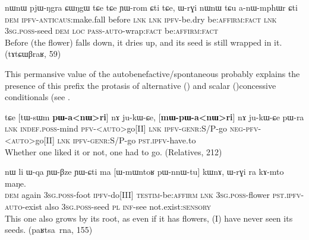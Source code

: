 \documentclass[oldfontcommands,oneside,a4paper,11pt]{article}
\newcommand{\ipa}[1]{{\phon \mbox{#1}}} %
\begin{document}
\begin{exe}
\ex \label{ex:anWmphWr}
\gll
\ipa{nɯnɯ} 	\ipa{pjɯ-ŋgra} 	\ipa{ɕɯŋgɯ} 	\ipa{tɕe} 	\ipa{tɕe} 	\ipa{ɲɯ-rom} 	\ipa{ɕti} 	\ipa{tɕe,} 	\ipa{ɯ-rɣi} 	\ipa{nɯnɯ} 	\ipa{tɕu} 	\ipa{a-nɯ-mphɯr} 	\ipa{ɕti} \\
\textsc{dem} \textsc{ipfv-anticaus}:make.fall before \textsc{lnk}  \textsc{lnk} \textsc{ipfv}-be.dry be\textsc{:affirm:fact} \textsc{lnk} \textsc{3sg.poss}-seed \textsc{dem} \textsc{loc} \textsc{pass-auto}-wrap:\textsc{fact} be\textsc{:affirm:fact} \\
\glt Before (the flower) falls down, it dries up, and its seed is still wrapped in it. (\ipa{tɤtɕɯβraʁ}, 59)
\end{exe} 



This permansive value of the autobenefactive/spontaneous probably explains the presence of this prefix the protasis of alternative  (\citealt{ex:pannWri}) and scalar (\citealt{ex:pWnnWtu.kWnA})concessive conditionals (see \citet{jacques14linking}.

\begin{exe}
\ex  \label{ex:pannWri}
\gll
\ipa{tɕe}  	[\ipa{tɯ-sɯm}  	\textbf{\ipa{pɯ-a<nɯ>ri}}]  	\ipa{nɤ}  	\ipa{ju-kɯ-ɕe,}  	[\textbf{\ipa{mɯ-pɯ-a<nɯ>ri}}]  	\ipa{nɤ}  	\ipa{ju-kɯ-ɕe}  	\ipa{pɯ-ra}  \\
\textsc{lnk} \textsc{indef.poss}-mind  \textsc{pfv-<auto>}go[II] \textsc{lnk} \textsc{ipfv-genr}:S/P-go \textsc{neg-pfv-<auto>}go[II] \textsc{lnk} \textsc{ipfv-genr}:S/P-go \textsc{pst.ipfv}-have.to \\
\glt Whether one liked it or not, one had to go. (Relatives, 212)
\end{exe}


 \begin{exe}
\ex  \label{ex:pWnnWtu.kWnA}
\gll
\ipa{nɯ}    	\ipa{li}    	\ipa{ɯ-qa}    	\ipa{ɲɯ-βze}    	\ipa{ɲɯ-ɕti}    	\ipa{ma}    	[\ipa{ɯ-mɯntoʁ}    	\ipa{pɯ-nnɯ-tu}]    	\ipa{kɯnɤ,}    	\ipa{ɯ-rɣi}    	\ipa{ra}    	\ipa{kɤ-mto}    	\ipa{maŋe.}    \\
\textsc{dem} again \textsc{3sg.poss}-foot \textsc{ipfv}-do[III] \textsc{testim}-be:\textsc{affirm} \textsc{lnk} \textsc{3sg.poss}-flower \textsc{pst.ipfv-auto}-exist also \textsc{3sg.poss}-seed \textsc{pl} \textsc{inf}-see not.exist:\textsc{sensory} \\
\glt This one also grows by its root, as even if it has flowers, (I) have never seen its seeds. (\ipa{paʁtsa rna}, 155)
\end{exe}
\end{document}
